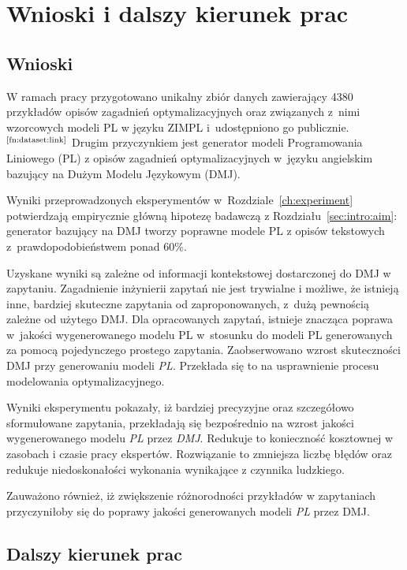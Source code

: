 
\chapter{Wnioski i dalszy kierunek prac}\label{ch:conclusions}

\section{Wnioski}


W ramach pracy przygotowano unikalny zbiór danych zawierający 4380 przykładów opisów zagadnień optymalizacyjnych oraz związanych z~nimi wzorcowych modeli PL w języku ZIMPL i~udostępniono go publicznie.$^\text{\ref{fn:dataset:link}}$ Drugim przyczynkiem jest generator modeli Programowania Liniowego (PL) z opisów zagadnień optymalizacyjnych w~języku angielskim bazujący na Dużym Modelu Językowym (DMJ). 

Wyniki przeprowadzonych eksperymentów w~Rozdziale~\ref{ch:experiment} potwierdzają empirycznie główną hipotezę badawczą z Rozdziału~\ref{sec:intro:aim}: generator bazujący na DMJ tworzy poprawne modele PL z opisów tekstowych z~prawdopodobieństwem ponad 60\%.


Uzyskane wyniki są zależne od informacji kontekstowej dostarczonej do DMJ w zapytaniu. Zagadnienie inżynierii zapytań nie jest trywialne i możliwe, że istnieją inne, bardziej skuteczne zapytania od zaproponowanych, z~dużą pewnością zależne od użytego DMJ. 
Dla opracowanych zapytań, istnieje znacząca poprawa w~jakości wygenerowanego modelu PL w~stosunku do modeli PL generowanych za pomocą pojedynczego prostego zapytania. Zaobserwowano wzrost skuteczności DMJ przy generowaniu modeli \textit{PL}. Przekłada się to na usprawnienie procesu modelowania optymalizacyjnego. 

Wyniki eksperymentu pokazały, iż bardziej precyzyjne oraz szczegółowo sformułowane zapytania, przekładają się bezpośrednio na wzrost jakości wygenerowanego modelu \textit{PL} przez \textit{DMJ}. Redukuje to konieczność kosztownej w zasobach i czasie pracy ekspertów. Rozwiązanie to zmniejsza liczbę błędów oraz redukuje niedoskonałości wykonania wynikające z czynnika ludzkiego. 

Zauważono również, iż zwiększenie różnorodności przykładów w zapytaniach przyczyniłoby się do poprawy jakości generowanych modeli \textit{PL} przez DMJ.

\section{Dalszy kierunek prac}


